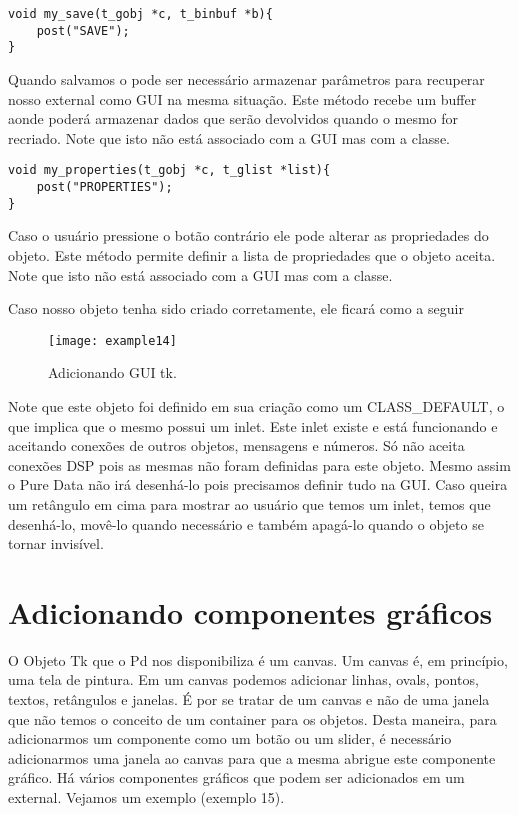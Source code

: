 \begin{lstlisting}
void my_save(t_gobj *c, t_binbuf *b){
	post("SAVE");
}
\end{lstlisting}

Quando salvamos o \patch pode ser necessário armazenar parâmetros para recuperar nosso external
como GUI na mesma situação. Este método recebe um buffer aonde poderá armazenar dados que serão
devolvidos quando o mesmo for recriado. Note que isto não está associado com a GUI mas com a classe.



\begin{lstlisting}
void my_properties(t_gobj *c, t_glist *list){
	post("PROPERTIES");
}
\end{lstlisting}

Caso o usuário pressione o botão contrário ele pode alterar as propriedades do objeto. Este método
permite definir a lista de propriedades que o objeto aceita. Note que isto não está associado com a GUI
mas com a classe.


Caso nosso objeto tenha sido criado corretamente, ele ficará como a seguir
\begin{figure}[h!]
	\centering
	\texttt{[image: example14]}
	\caption{Adicionando GUI tk.}
\end{figure}

Note que este objeto foi definido em sua criação como um CLASS\_DEFAULT, o que implica que o mesmo possui
um inlet. Este inlet existe e está funcionando e aceitando conexões de outros objetos, mensagens e números.
Só não aceita conexões DSP pois as mesmas não foram definidas para este objeto. 
Mesmo assim o Pure Data não irá desenhá-lo pois precisamos definir tudo na GUI. Caso queira um
retângulo em cima para mostrar ao usuário que temos um inlet, temos que desenhá-lo, movê-lo quando necessário e 
também apagá-lo quando o objeto se tornar invisível.

\section{Adicionando componentes gráficos}

O Objeto Tk que o Pd nos disponibiliza é um canvas. Um canvas é, em princípio, uma tela de pintura. Em um canvas 
podemos adicionar linhas, ovals, pontos, textos, retângulos e janelas. É por se tratar de um canvas e não de uma
janela que não temos o conceito de um container para os objetos. Desta maneira, para adicionarmos um componente 
como um botão ou um slider, é necessário adicionarmos uma janela ao canvas para que a mesma abrigue este componente gráfico.
Há vários componentes gráficos que podem ser adicionados em um external. Vejamos um exemplo (exemplo 15).

